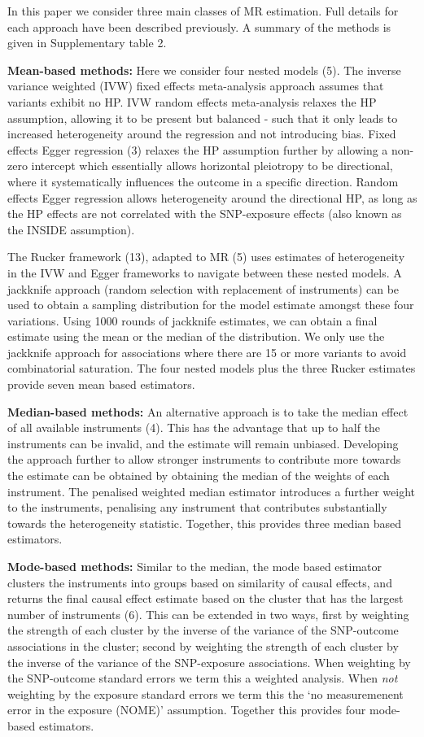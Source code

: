 \documentclass[]{article}
\begin{document}
In this paper we consider three main classes of MR estimation. Full
details for each approach have been described previously. A summary of
the methods is given in Supplementary table 2.

\textbf{Mean-based methods:} Here we consider four nested models (5).
The inverse variance weighted (IVW) fixed effects meta-analysis approach
assumes that variants exhibit no HP. IVW random effects meta-analysis
relaxes the HP assumption, allowing it to be present but balanced - such
that it only leads to increased heterogeneity around the regression and
not introducing bias. Fixed effects Egger regression (3) relaxes the HP
assumption further by allowing a non-zero intercept which essentially
allows horizontal pleiotropy to be directional, where it systematically
influences the outcome in a specific direction. Random effects Egger
regression allows heterogeneity around the directional HP, as long as
the HP effects are not correlated with the SNP-exposure effects (also
known as the INSIDE assumption).

The Rucker framework (13), adapted to MR (5) uses estimates of
heterogeneity in the IVW and Egger frameworks to navigate between these
nested models. A jackknife approach (random selection with replacement
of instruments) can be used to obtain a sampling distribution for the
model estimate amongst these four variations. Using 1000 rounds of
jackknife estimates, we can obtain a final estimate using the mean or
the median of the distribution. We only use the jackknife approach for
associations where there are 15 or more variants to avoid combinatorial
saturation. The four nested models plus the three Rucker estimates
provide seven mean based estimators.

\textbf{Median-based methods:} An alternative approach is to take the
median effect of all available instruments (4). This has the advantage
that up to half the instruments can be invalid, and the estimate will
remain unbiased. Developing the approach further to allow stronger
instruments to contribute more towards the estimate can be obtained by
obtaining the median of the weights of each instrument. The penalised
weighted median estimator introduces a further weight to the
instruments, penalising any instrument that contributes substantially
towards the heterogeneity statistic. Together, this provides three
median based estimators.

\textbf{Mode-based methods:} Similar to the median, the mode based
estimator clusters the instruments into groups based on similarity of
causal effects, and returns the final causal effect estimate based on
the cluster that has the largest number of instruments (6). This can be
extended in two ways, first by weighting the strength of each cluster by
the inverse of the variance of the SNP-outcome associations in the
cluster; second by weighting the strength of each cluster by the inverse
of the variance of the SNP-exposure associations. When weighting by the
SNP-outcome standard errors we term this a weighted analysis. When
\emph{not} weighting by the exposure standard errors we term this the
`no measuremenent error in the exposure (NOME)' assumption. Together
this provides four mode-based estimators.
\end{document}
